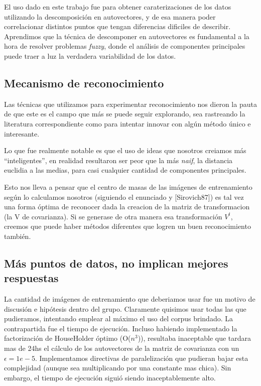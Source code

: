 El uso dado en este trabajo fue para obtener caraterizaciones de los datos utilizando la
descomposici\'on en autovectores, y de esa manera poder correlacionar distintos puntos que
tengan diferencias dificiles de describir. Aprendimos que la t\'ecnica de descomponer en autovectores
es fundamental a la hora de resolver problemas \textit{fuzzy}, donde
el an\'alisis de componentes principales puede traer a luz la verdadera variabilidad de los datos.


\subsection{Mecanismo de reconocimiento}

Las t\'ecnicas que utilizamos para experimentar reconocimiento nos dieron
la pauta de que este es el campo que m\'as se puede seguir explorando, sea rastreando la literatura
correspondiente como para intentar innovar con alg\'un m\'etodo \'unico e interesante.

Lo que fue realmente notable es que el uso de ideas que nosotros creiamos m\'as ``inteligentes'',
en realidad resultaron ser peor que la m\'as \textit{naif}, la distancia euclidia a las medias, para
casi cualquier cantidad de componentes principales.

Esto nos lleva a pensar que el centro de masas de las im\'agenes de entrenamiento seg\'un lo calculamos
nosotros (siguiendo el enunciado y [Sirovich87]) es tal vez una forma \'optima de reconocer
dada la creacion de la matriz de transformacion (la V de covarianza). Si se generase de otra manera esa
transformaci\'on $V^t$, creemos que puede haber m\'etodos diferentes que logren un buen reconocimiento tambi\'en.


\subsection{M\'as puntos de datos, no implican mejores respuestas}

La cantidad de im\'agenes de entrenamiento que deberiamos usar fue un motivo de
discusi\'on e hip\'otesis dentro del grupo. 
Claramente quisimos usar todas las que pudieramos, intentando emplear al m\'aximo el
uso del corpus brindado. La contrapartida fue el tiempo de ejecuci\'on. Incluso habiendo implementado
la factorizaci\'on de HouseHolder \'optimo (O($n^3$)), resultaba inaceptable que tardara mas de 24hs
el c\'alculo de los autovectores de la matriz de covarianza con un $\epsilon = 1e-5$. Implementamos
directivas de paralelizaci\'on que pudieran bajar esta complejidad (aunque sea multiplicando por una
constante mas chica). Sin embargo, el tiempo de ejecuci\'on sigui\'o siendo inaceptablemente alto.

